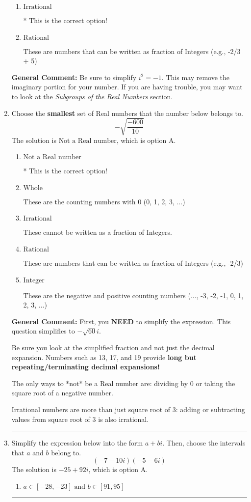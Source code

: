 \documentclass{extbook}[14pt]
\newcommand{\litem}[1]{\item #1

\rule{\textwidth}{0.4pt}}
\begin{document}
\begin{enumerate}
{\begin{enumerate}[label=\Alph*.]
This is a Complex number $(a+bi)$ that \textbf{only} has an imaginary part like $2i$.
\item \( \text{Irrational} \)

* This is the correct option!
\item \( \text{Rational} \)

These are numbers that can be written as fraction of Integers (e.g., -2/3 + 5)
\end{enumerate}

\textbf{General Comment:} Be sure to simplify $i^2 = -1$. This may remove the imaginary portion for your number. If you are having trouble, you may want to look at the \textit{Subgroups of the Real Numbers} section.
}
\litem{
Choose the \textbf{smallest} set of Real numbers that the number below belongs to.
\[ -\sqrt{\frac{-600}{10}} \]
The solution is \( \text{Not a Real number} \), which is option A.\begin{enumerate}[label=\Alph*.]
\item \( \text{Not a Real number} \)

* This is the correct option!
\item \( \text{Whole} \)

These are the counting numbers with 0 (0, 1, 2, 3, ...)
\item \( \text{Irrational} \)

These cannot be written as a fraction of Integers.
\item \( \text{Rational} \)

These are numbers that can be written as fraction of Integers (e.g., -2/3)
\item \( \text{Integer} \)

These are the negative and positive counting numbers (..., -3, -2, -1, 0, 1, 2, 3, ...)
\end{enumerate}

\textbf{General Comment:} First, you \textbf{NEED} to simplify the expression. This question simplifies to $-\sqrt{60} i$. 
 
 Be sure you look at the simplified fraction and not just the decimal expansion. Numbers such as 13, 17, and 19 provide \textbf{long but repeating/terminating decimal expansions!} 
 
 The only ways to *not* be a Real number are: dividing by 0 or taking the square root of a negative number. 
 
 Irrational numbers are more than just square root of 3: adding or subtracting values from square root of 3 is also irrational.
}
\litem{
Simplify the expression below into the form $a+bi$. Then, choose the intervals that $a$ and $b$ belong to.
\[ (-7 - 10 i)(-5 - 6 i) \]
The solution is \( -25 + 92 i \), which is option A.\begin{enumerate}[label=\Alph*.]
\item \( a \in [-28, -23] \text{ and } b \in [91, 95] \)


\end{enumerate}}
\end{enumerate}
\end{document}
